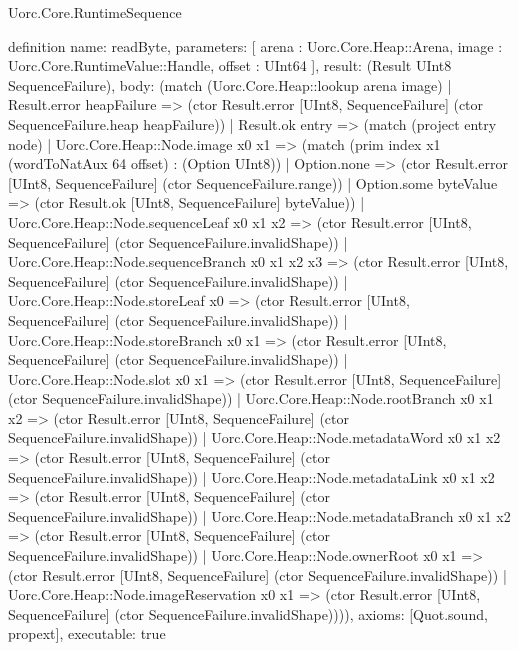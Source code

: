\begin{lexlean}{Uorc.Core.RuntimeSequence}
\begin{semanticmodule}
definition{
  name: readByte,
  parameters: [
    arena : Uorc.Core.Heap::Arena,
    image : Uorc.Core.RuntimeValue::Handle,
    offset : UInt64
  ],
  result: (Result UInt8 SequenceFailure),
  body: (match (Uorc.Core.Heap::lookup arena image)
    | Result.error heapFailure => (ctor Result.error [UInt8, SequenceFailure] (ctor SequenceFailure.heap heapFailure))
    | Result.ok entry => (match (project entry node)
      | Uorc.Core.Heap::Node.image x0 x1 => (match (prim index x1 (wordToNatAux 64 offset) : (Option UInt8))
        | Option.none => (ctor Result.error [UInt8, SequenceFailure] (ctor SequenceFailure.range))
        | Option.some byteValue => (ctor Result.ok [UInt8, SequenceFailure] byteValue))
      | Uorc.Core.Heap::Node.sequenceLeaf x0 x1 x2 => (ctor Result.error [UInt8, SequenceFailure] (ctor SequenceFailure.invalidShape))
      | Uorc.Core.Heap::Node.sequenceBranch x0 x1 x2 x3 => (ctor Result.error [UInt8, SequenceFailure] (ctor SequenceFailure.invalidShape))
      | Uorc.Core.Heap::Node.storeLeaf x0 => (ctor Result.error [UInt8, SequenceFailure] (ctor SequenceFailure.invalidShape))
      | Uorc.Core.Heap::Node.storeBranch x0 x1 => (ctor Result.error [UInt8, SequenceFailure] (ctor SequenceFailure.invalidShape))
      | Uorc.Core.Heap::Node.slot x0 x1 => (ctor Result.error [UInt8, SequenceFailure] (ctor SequenceFailure.invalidShape))
      | Uorc.Core.Heap::Node.rootBranch x0 x1 x2 => (ctor Result.error [UInt8, SequenceFailure] (ctor SequenceFailure.invalidShape))
      | Uorc.Core.Heap::Node.metadataWord x0 x1 x2 => (ctor Result.error [UInt8, SequenceFailure] (ctor SequenceFailure.invalidShape))
      | Uorc.Core.Heap::Node.metadataLink x0 x1 x2 => (ctor Result.error [UInt8, SequenceFailure] (ctor SequenceFailure.invalidShape))
      | Uorc.Core.Heap::Node.metadataBranch x0 x1 x2 => (ctor Result.error [UInt8, SequenceFailure] (ctor SequenceFailure.invalidShape))
      | Uorc.Core.Heap::Node.ownerRoot x0 x1 => (ctor Result.error [UInt8, SequenceFailure] (ctor SequenceFailure.invalidShape))
      | Uorc.Core.Heap::Node.imageReservation x0 x1 => (ctor Result.error [UInt8, SequenceFailure] (ctor SequenceFailure.invalidShape)))),
  axioms: [Quot.sound, propext],
  executable: true
}


\end{semanticmodule}
\end{lexlean}
